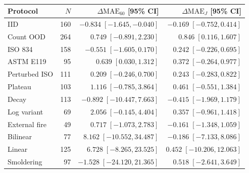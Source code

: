 \begin{table}[!htbp]
\centering\small
\caption{\EngineeringScalarCaption}
\label{tab:engineering-secondary}
\setlength{\tabcolsep}{4pt}
\begin{tabular*}{\linewidth}{@{\extracolsep{\fill}}lrrr@{}}
\toprule
Protocol & $N$ & $\Delta\mathrm{MAE}_{60}$ [95\% CI] & $\Delta\mathrm{MAE}_{J}$ [95\% CI] \\
\midrule
IID & 160 & $-0.834\;[-1.645,-0.040]$ & $-0.169\;[-0.752,0.414]$ \\
Count OOD & 264 & $0.749\;[-0.891,2.230]$ & $0.846\;[0.116,1.607]$ \\
ISO 834 & 158 & $-0.551\;[-1.605,0.170]$ & $0.242\;[-0.226,0.695]$ \\
ASTM E119 & 95 & $0.639\;[0.030,1.312]$ & $0.372\;[-0.264,0.977]$ \\
Perturbed ISO & 111 & $0.209\;[-0.246,0.700]$ & $0.243\;[-0.283,0.822]$ \\
Plateau & 103 & $1.116\;[-0.785,3.864]$ & $0.461\;[-0.551,1.384]$ \\
Decay & 113 & $-0.892\;[-10.447,7.663]$ & $-0.415\;[-1.969,1.179]$ \\
Log variant & 69 & $2.056\;[-0.145,4.404]$ & $0.357\;[-0.961,1.418]$ \\
External fire & 49 & $0.717\;[-1.073,2.783]$ & $-0.161\;[-1.348,1.059]$ \\
Bilinear & 77 & $8.162\;[-10.552,34.487]$ & $-0.186\;[-7.133,8.086]$ \\
Linear & 125 & $6.728\;[-8.265,23.525]$ & $0.452\;[-10.206,12.063]$ \\
Smoldering & 97 & $-1.528\;[-24.120,21.365]$ & $0.518\;[-2.641,3.649]$ \\
\bottomrule
\end{tabular*}
\end{table}
